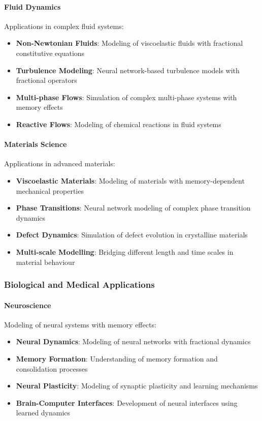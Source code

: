 \paragraph{Fluid Dynamics}
Applications in complex fluid systems:

\begin{itemize}
    \item \textbf{Non-Newtonian Fluids}: Modeling of viscoelastic fluids with fractional constitutive equations
    \item \textbf{Turbulence Modeling}: Neural network-based turbulence models with fractional operators
    \item \textbf{Multi-phase Flows}: Simulation of complex multi-phase systems with memory effects
    \item \textbf{Reactive Flows}: Modeling of chemical reactions in fluid systems
\end{itemize}

\paragraph{Materials Science}
Applications in advanced materials:

\begin{itemize}
    \item \textbf{Viscoelastic Materials}: Modeling of materials with memory-dependent mechanical properties
    \item \textbf{Phase Transitions}: Neural network modeling of complex phase transition dynamics
    \item \textbf{Defect Dynamics}: Simulation of defect evolution in crystalline materials
    \item \textbf{Multi-scale Modelling}: Bridging different length and time scales in material behaviour
\end{itemize}

\subsubsection{Biological and Medical Applications}

\paragraph{Neuroscience}
Modeling of neural systems with memory effects:

\begin{itemize}
    \item \textbf{Neural Dynamics}: Modeling of neural networks with fractional dynamics
    \item \textbf{Memory Formation}: Understanding of memory formation and consolidation processes
    \item \textbf{Neural Plasticity}: Modeling of synaptic plasticity and learning mechanisms
    \item \textbf{Brain-Computer Interfaces}: Development of neural interfaces using learned dynamics
\end{itemize}

